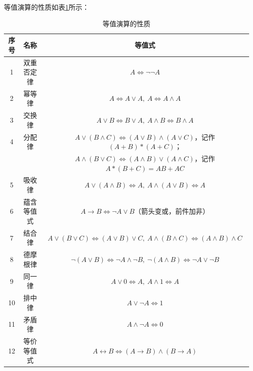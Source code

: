 \documentclass{ctexart}
\numberwithin{figure}{section}
\numberwithin{equation}{section}
\numberwithin{table}{section}
\begin{document}
        等值演算的性质如表\ref{等值演算的性质}所示：
        \renewcommand{\arraystretch}{1.5}
        \begin{table}[htbp]
            \centering
            \caption{等值演算的性质}\label{等值演算的性质}
            \small
            \begin{tabular}{ccc}
                \toprule
                序号 & 名称 & 等值式 \\
                \midrule
                1 & 双重否定律 & $A \Leftrightarrow \neg \neg A$ \\
                2 & 幂等律 & $A\Leftrightarrow A\vee A,\ A\Leftrightarrow A\wedge A$ \\
                3 & 交换律 & $A\vee B \Leftrightarrow B \vee A,\ A\wedge B \Leftrightarrow B \wedge A$ \\
                4 & 分配律 & $A\vee(B\wedge C)\Leftrightarrow (A\vee B)\wedge(A\vee C)$，记作$(A+B)*(A+C)$；\\
                  &         & $A\wedge(B\vee C)\Leftrightarrow (A \wedge B)\vee(A\wedge C)$，记作$A*(B+C)=AB+AC$ \\
                5 & 吸收律 & $A\vee (A\wedge B)\Leftrightarrow A,\ A\wedge(A\vee B)\Leftrightarrow A$ \\
                6 & 蕴含等值式 & $A\rightarrow B\Leftrightarrow \neg A\vee B$（箭头变或，前件加非）\\
                7 & 结合律 & $A\vee(B\vee C)\Leftrightarrow(A\vee B)\vee C,\ A\wedge(B\wedge C)\Leftrightarrow(A\wedge B)\wedge C$ \\
                8 & 德摩根律 & $\neg(A\vee B)\Leftrightarrow \neg A\wedge\neg B,\ \neg(A\wedge B)\Leftrightarrow \neg A\vee\neg B$ \\
                9 & 同一律 & $A\vee 0\Leftrightarrow A,\ A\wedge 1\Leftrightarrow A$ \\
                10 & 排中律 & $A\vee\neg A\Leftrightarrow 1$ \\
                11 & 矛盾律 & $A\wedge\neg A\Leftrightarrow 0$ \\
                12 & 等价等值式 & $A\leftrightarrow B\Leftrightarrow (A\rightarrow B)\wedge(B\rightarrow A)$ \\
                \bottomrule
            \end{tabular}
        \end{table}
\end{document}
